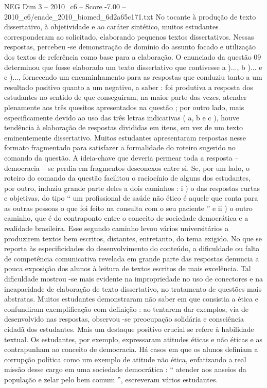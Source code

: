 \begin{textsample}{NEG Dim 3 – 2010\_c6 – Score -7.00 – 2010\_c6/enade\_2010\_biomed\_6d2a65c171.txt}
No tocante à produção de texto dissertativo, à objetividade e ao caráter sintético, muitos estudantes corresponderam ao solicitado, elaborando pequenos textos dissertativos.
Nessas respostas, percebeu -se demonstração de domínio do assunto focado e utilização dos textos de referência como base para a elaboração.
O enunciado da questão 09 determinou que fosse elaborado um texto dissertativo que contivesse a )..., b )... e c )..., fornecendo um encaminhamento para as respostas que conduziu tanto a um resultado positivo quanto a um negativo, a saber : foi produtiva a resposta dos estudantes no sentido de que conseguiram, na maior parte das vezes, atender plenamente aos três quesitos apresentados na questão ; por outro lado, mais especificamente devido ao uso das três letras indicativas ( a, b e c ), houve tendência à elaboração de respostas divididas em itens, em vez de um texto eminentemente dissertativo.
Muitos estudantes apresentaram respostas nesse formato fragmentado para satisfazer a formalidade do roteiro sugerido no comando da questão.
A ideia-chave que deveria permear toda a resposta – democracia – se perdia em fragmentos desconexos entre si.
Se, por um lado, o roteiro do comando da questão facilitou o raciocínio de alguns dos estudantes, por outro, induziu grande parte deles a dois caminhos : i ) o das respostas curtas e objetivas, do tipo “ um profissional de saúde não ético é aquele que conta para as outras pessoas o que foi feito na consulta com o seu paciente ” e ii ) o outro caminho, que é do contraponto entre o conceito de sociedade democrática e a realidade brasileira.
Esse segundo caminho levou vários universitários a produzirem textos bem escritos, distantes, entretanto, do tema exigido.
No que se reporta às especificidades do desenvolvimento do conteúdo, a dificuldade ou falta de competência comunicativa revelada em grande parte das respostas denuncia a pouca exposição dos alunos à leitura de textos escritos de mais excelência.
Tal dificuldade mostrou -se mais evidente na impropriedade no uso de conectores e na incapacidade de elaboração de texto dissertativo, no tratamento de questões mais abstratas.
Muitos estudantes demonstraram não saber em que consistia a ética e confundiram exemplificação com definição : ao tentarem dar exemplos, via de desenvolvido nas respostas, observou -se preocupação solidária e consciência cidadã dos estudantes.
Mais um destaque positivo crucial se refere à habilidade textual.
Os estudantes, por exemplo, expressaram atitudes éticas e não éticas e as contrapunham ao conceito de democracia.
Há casos em que os alunos definiam a corrupção política como um exemplo de atitude não ética, enfatizando a real missão desse cargo em uma sociedade democrática : “ atender aos anseios da população e zelar pelo bem comum ”, escreveram vários estudantes.

\end{textsample}
